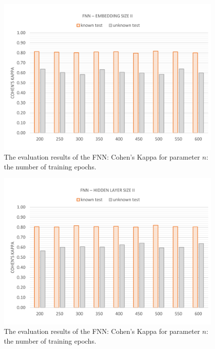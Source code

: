 \vspace{-11mm}
\begin{figure}[H]
	\centering\includegraphics[width=\textwidth]{images/evaluation_fnn_e2_k}
	\caption[FNN Evaluation: Number of Training Epochs]{The evaluation results of the FNN: Cohen's Kappa for parameter $n$: the number of training epochs.}
	\label{f.evaluation.fnn.e2.k}
\end{figure}

\vspace{-11mm}
\begin{figure}[H]
	\centering\includegraphics[width=\textwidth]{images/evaluation_fnn_s2_k}
	\caption[FNN Evaluation: Number of Training Epochs]{The evaluation results of the FNN: Cohen's Kappa for parameter $n$: the number of training epochs.}
	\label{f.evaluation.fnn.s2.k}
\end{figure}

